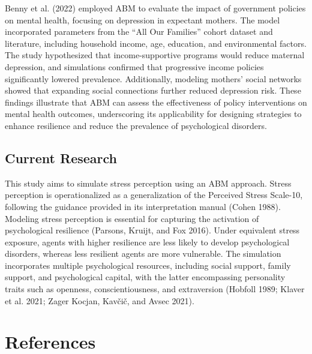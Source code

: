 \documentclass[
  letterpaper,
  DIV=11,
  numbers=noendperiod]{scrartcl}
\begin{document}
Benny et al. (2022) employed ABM to evaluate the impact of government
policies on mental health, focusing on depression in expectant mothers.
The model incorporated parameters from the ``All Our Families'' cohort
dataset and literature, including household income, age, education, and
environmental factors. The study hypothesized that income-supportive
programs would reduce maternal depression, and simulations confirmed
that progressive income policies significantly lowered prevalence.
Additionally, modeling mothers' social networks showed that expanding
social connections further reduced depression risk. These findings
illustrate that ABM can assess the effectiveness of policy interventions
on mental health outcomes, underscoring its applicability for designing
strategies to enhance resilience and reduce the prevalence of
psychological disorders.

\subsection{Current Research}\label{current-research}

This study aims to simulate stress perception using an ABM approach.
Stress perception is operationalized as a generalization of the
Perceived Stress Scale-10, following the guidance provided in its
interpretation manual (Cohen 1988). Modeling stress perception is
essential for capturing the activation of psychological resilience
(Parsons, Kruijt, and Fox 2016). Under equivalent stress exposure,
agents with higher resilience are less likely to develop psychological
disorders, whereas less resilient agents are more vulnerable. The
simulation incorporates multiple psychological resources, including
social support, family support, and psychological capital, with the
latter encompassing personality traits such as openness,
conscientiousness, and extraversion (Hobfoll 1989; Klaver et al. 2021;
Zager Kocjan, Kavčič, and Avsec 2021).

\section*{References}\label{references}

\footnotesize
\end{document}

